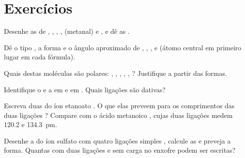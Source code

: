 \section{Exercícios}

\begin{exercise}[$\star$]\label{exo:b1:lewis-resonance-vsepr:1}
Desenhe as  de , , , ,
 (metanal) e , e dê as .
\end{exercise}

\begin{exercise}[$\star$]\label{exo:b1:lewis-resonance-vsepr:2}
Dê o tipo , a forma e o ângulo aproximado de
, , ,  e  (átomo central
em primeiro lugar em cada fórmula).
\end{exercise}

\begin{exercise}[$\star$]\label{exo:b1:lewis-resonance-vsepr:3}
Quais destas moléculas são polares: , , ,
, , ? Justifique a partir das formas.
\end{exercise}

\begin{exercise}[$\star$]\label{exo:b1:lewis-resonance-vsepr:4}
Identifique o  e a  em  e
em . Quais ligações são dativas?
\end{exercise}

\begin{exercise}[$\star\star$]\label{exo:b1:lewis-resonance-vsepr:5}
Escreva duas  do íon etanoato . O que
elas preveem para os comprimentos das duas ligações ? Compare com o
ácido metanoico , cujas duas ligações  medem 120.2 e
\qty{134.3}{pm}.
\end{exercise}

\begin{exercise}[$\star\star$]\label{exo:b1:lewis-resonance-vsepr:6}
Desenhe a  do íon sulfato  com quatro
ligações simples , calcule as  e preveja a
forma. Quantas  com duas ligações  e
sem carga no enxofre podem ser escritas?
\end{exercise}

